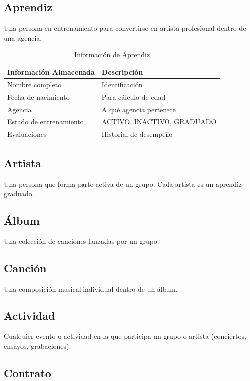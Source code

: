 \documentclass[12pt,a4paper,spanish,oneside]{report}
\begin{document}
\subsection{Aprendiz}

Una persona en entrenamiento para convertirse en artista profesional dentro de una agencia.

\begin{table}[H]
\centering
\caption{Información de Aprendiz}
\begin{tabular}{|l|p{7cm}|}
\hline
\textbf{Información Almacenada} & \textbf{Descripción} \\
\hline
Nombre completo & Identificación \\
\hline
Fecha de nacimiento & Para cálculo de edad \\
\hline
Agencia & A qué agencia pertenece \\
\hline
Estado de entrenamiento & ACTIVO, INACTIVO, GRADUADO \\
\hline
Evaluaciones & Historial de desempeño \\
\hline
\end{tabular}
\end{table}

\subsection{Artista}

Una persona que forma parte activa de un grupo. Cada artista es un aprendiz graduado.

\subsection{Álbum}

Una colección de canciones lanzadas por un grupo.

\subsection{Canción}

Una composición musical individual dentro de un álbum.

\subsection{Actividad}

Cualquier evento o actividad en la que participa un grupo o artista (conciertos, ensayos, grabaciones).

\subsection{Contrato}
\end{document}
